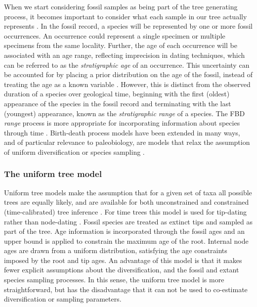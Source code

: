 \documentclass[11pt]{article}
\begin{document}
When we start considering fossil samples as being part of the tree generating process, it becomes important to consider what each sample in our tree actually represents \cite{Hopkins2018}. 
In the fossil record, a species will be represented by one or more fossil occurrences.
An occurrence could represent a single specimen or multiple specimens from the same locality.
Further, the age of each occurrence will be associated with an age range, reflecting imprecision in dating techniques, which can be referred to as the \textit{stratigraphic age} of an occurrence.
This uncertainty can be accounted for by placing a prior distribution on the age of the fossil, instead of treating the age as a known variable \cite{Drummond2016,BaridoSottani2019a}.
However, this is distinct from the observed duration of a species over geological time, beginning with the first (oldest) appearance of the species in the fossil record and terminating with the last (youngest) appearance, known as the \textit{stratigraphic range} of a species.
The FBD \textit{range} process is more appropriate for incorporating information about species through time \cite{Stadler2017}.
Birth-death process models have been extended in many ways, and of particular relevance to paleobiology, are models that relax the assumption of uniform diversification or species sampling \cite{Hoehna2011,Stadler2013b,Gavryushkina2014,Zhang2016,Kuehnert2016,BaridoSottani2018}.

\subsubsection{The uniform tree model}

Uniform tree models make the assumption that for a given set of taxa all possible trees are equally likely, and are available for both unconstrained and constrained (time-calibrated) tree inference \cite{Huelsenbeck2001a,Ronquist2012a}.
For time trees this model is used for tip-dating rather than node-dating \cite{Ronquist2012a}.
Fossil species are treated as extinct tips and sampled as part of the tree.
Age information is incorporated through the fossil ages and an upper bound is applied to constrain the maximum age of the root.
Internal node ages are drawn from a uniform distribution, satisfying the age constraints imposed by the root and tip ages.
An advantage of this model is that it makes fewer explicit assumptions about the diversification, and the fossil and extant species sampling processes. 
In this sense, the  uniform tree model is more straightforward, but has the disadvantage that it can not be used to co-estimate diversification or sampling parameters.
\end{document}
